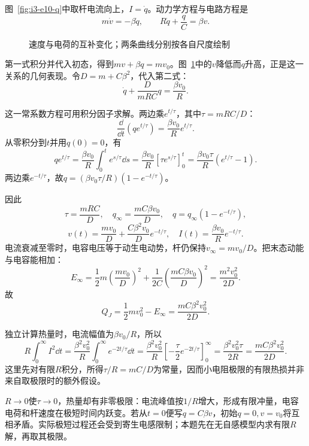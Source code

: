 \begin{solution}
图~\ref{fig:i3-e10-q}中取杆电流向上，$I=\dot q$。动力学方程与电路方程是
\[
m\dot v=-\beta\dot q,\qquad R\dot q+\frac qC=\beta v.
\]

\begin{figure}[H]\centering
{}
\caption{速度与电荷的互补变化；两条曲线分别按各自尺度绘制}\label{fig:i3-e10-s}
\end{figure}

第一式积分并代入初态，得到$mv+\beta q=mv_0$。图~\ref{fig:i3-e10-s}中的$v$降低而$q$升高，正是这一关系的几何表现。令$D=m+C\beta^2$，代入第二式：
\[
\dot q+\frac{D}{mRC}q=\frac{\beta v_0}{R}.
\]

这一常系数方程可用积分因子求解。两边乘$e^{t/\tau}$，其中$\tau=mRC/D$：
\[
\frac{\dd}{\dd t}(qe^{t/\tau})
=\frac{\beta v_0}{R}e^{t/\tau}.
\]
从零积分到$t$并用$q(0)=0$，有
\[qe^{t/\tau}=\frac{\beta v_0}{R}\int_0^te^{s/\tau}\dd s
=\frac{\beta v_0}{R}[\tau e^{s/\tau}]_0^t
=\frac{\beta v_0\tau}{R}(e^{t/\tau}-1).\]
两边乘$e^{-t/\tau}$，故$q=(\beta v_0\tau/R)(1-e^{-t/\tau})$。


因此
\[
\tau=\frac{mRC}{D},\quad q_\infty=\frac{mC\beta v_0}{D},\quad
q=q_\infty(1-e^{-t/\tau}),
\]
\[
\boxed{v(t)=\frac{mv_0}{D}+\frac{C\beta^2v_0}{D}e^{-t/\tau}},\quad
I(t)=\frac{\beta v_0}{R}e^{-t/\tau}.
\]
电流衰减至零时，电容电压等于动生电动势，杆仍保持$v_\infty=mv_0/D$。把末态动能与电容能相加：
\[
E_\infty=\frac12m\left(\frac{mv_0}{D}\right)^2
+\frac1{2C}\left(\frac{mC\beta v_0}{D}\right)^2
=\frac{m^2v_0^2}{2D}.
\]
故
\[
\boxed{Q_J=\frac12mv_0^2-E_\infty
=\frac{mC\beta^2v_0^2}{2D}}.
\]

独立计算热量时，电流幅值为$\beta v_0/R$，所以
\[
R\int_0^\infty I^2\dd t
=\frac{\beta^2v_0^2}{R}\int_0^\infty e^{-2t/\tau}\dd t
=\frac{\beta^2v_0^2}{R}\left[-\frac\tau2e^{-2t/\tau}\right]_0^\infty
=\frac{\beta^2v_0^2\tau}{2R}
=\frac{mC\beta^2v_0^2}{2D}.
\]
这里先对有限$R$积分，所得$\tau/R=mC/D$为常量，因而小电阻极限的有限热损并非来自取极限时的额外假设。


$R\to0$使$\tau\to0$，热量却有非零极限：电流峰值按$1/R$增大，形成有限冲量，电容电荷和杆速度在极短时间内跃变。若从$t=0$便写$q=C\beta v$，初始$q=0,v=v_0$将互相矛盾。实际极短过程还会受到寄生电感限制；本题先在无自感模型内求有限$R$解，再取其极限。
\end{solution}

